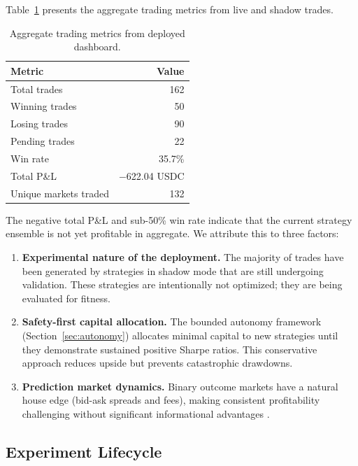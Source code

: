 Table~\ref{tab:metrics} presents the aggregate trading metrics from live and shadow trades.

\begin{table}[H]
    \centering
    \caption{Aggregate trading metrics from deployed dashboard.}
    \label{tab:metrics}
    \begin{tabular}{lr}
        \toprule
        \textbf{Metric} & \textbf{Value} \\
        \midrule
        Total trades & 162 \\
        Winning trades & 50 \\
        Losing trades & 90 \\
        Pending trades & 22 \\
        Win rate & 35.7\% \\
        Total P\&L & $-$622.04 USDC \\
        Unique markets traded & 132 \\
        \bottomrule
    \end{tabular}
\end{table}

The negative total P\&L and sub-50\% win rate indicate that the current strategy ensemble is not yet profitable in aggregate. We attribute this to three factors:
\begin{enumerate}
    \item \textbf{Experimental nature of the deployment.} The majority of trades have been generated by strategies in shadow mode that are still undergoing validation. These strategies are intentionally not optimized; they are being evaluated for fitness.
    \item \textbf{Safety-first capital allocation.} The bounded autonomy framework (Section~\ref{sec:autonomy}) allocates minimal capital to new strategies until they demonstrate sustained positive Sharpe ratios. This conservative approach reduces upside but prevents catastrophic drawdowns.
    \item \textbf{Prediction market dynamics.} Binary outcome markets have a natural house edge (bid-ask spreads and fees), making consistent profitability challenging without significant informational advantages \citep{hanson2003combinatorial}.
\end{enumerate}

\subsection{Experiment Lifecycle}

